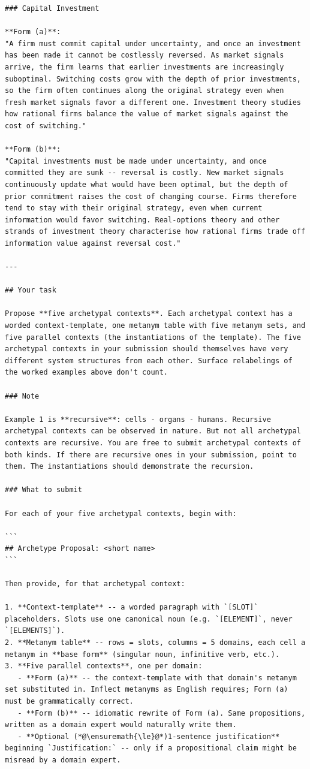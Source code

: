 \documentclass{article}
\begin{document}
\begin{lstlisting}
### Capital Investment

**Form (a)**:
"A firm must commit capital under uncertainty, and once an investment has been made it cannot be costlessly reversed. As market signals arrive, the firm learns that earlier investments are increasingly suboptimal. Switching costs grow with the depth of prior investments, so the firm often continues along the original strategy even when fresh market signals favor a different one. Investment theory studies how rational firms balance the value of market signals against the cost of switching."

**Form (b)**:
"Capital investments must be made under uncertainty, and once committed they are sunk -- reversal is costly. New market signals continuously update what would have been optimal, but the depth of prior commitment raises the cost of changing course. Firms therefore tend to stay with their original strategy, even when current information would favor switching. Real-options theory and other strands of investment theory characterise how rational firms trade off information value against reversal cost."

---

## Your task

Propose **five archetypal contexts**. Each archetypal context has a worded context-template, one metanym table with five metanym sets, and five parallel contexts (the instantiations of the template). The five archetypal contexts in your submission should themselves have very different system structures from each other. Surface relabelings of the worked examples above don't count.

### Note

Example 1 is **recursive**: cells - organs - humans. Recursive archetypal contexts can be observed in nature. But not all archetypal contexts are recursive. You are free to submit archetypal contexts of both kinds. If there are recursive ones in your submission, point to them. The instantiations should demonstrate the recursion.

### What to submit

For each of your five archetypal contexts, begin with:

```
## Archetype Proposal: <short name>
```

Then provide, for that archetypal context:

1. **Context-template** -- a worded paragraph with `[SLOT]` placeholders. Slots use one canonical noun (e.g. `[ELEMENT]`, never `[ELEMENTS]`).
2. **Metanym table** -- rows = slots, columns = 5 domains, each cell a metanym in **base form** (singular noun, infinitive verb, etc.).
3. **Five parallel contexts**, one per domain:
   - **Form (a)** -- the context-template with that domain's metanym set substituted in. Inflect metanyms as English requires; Form (a) must be grammatically correct.
   - **Form (b)** -- idiomatic rewrite of Form (a). Same propositions, written as a domain expert would naturally write them.
   - **Optional (*@\ensuremath{\le}@*)1-sentence justification** beginning `Justification:` -- only if a propositional claim might be misread by a domain expert.


\end{lstlisting}
\end{document}

